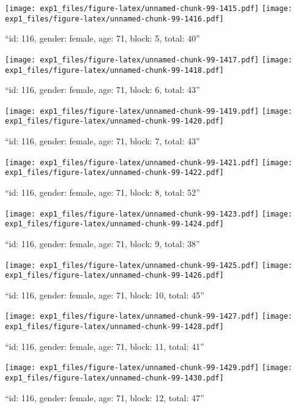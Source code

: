 \documentclass[,]{article}
\begin{document}
\texttt{[image: exp1\_files/figure-latex/unnamed-chunk-99-1415.pdf]}
\texttt{[image: exp1\_files/figure-latex/unnamed-chunk-99-1416.pdf]}

\newpage
[1] 

``id: 116, gender: female, age: 71, block: 5, total: 40''

\texttt{[image: exp1\_files/figure-latex/unnamed-chunk-99-1417.pdf]}
\texttt{[image: exp1\_files/figure-latex/unnamed-chunk-99-1418.pdf]}

\newpage
[1] 

``id: 116, gender: female, age: 71, block: 6, total: 43''

\texttt{[image: exp1\_files/figure-latex/unnamed-chunk-99-1419.pdf]}
\texttt{[image: exp1\_files/figure-latex/unnamed-chunk-99-1420.pdf]}

\newpage
[1] 

``id: 116, gender: female, age: 71, block: 7, total: 43''

\texttt{[image: exp1\_files/figure-latex/unnamed-chunk-99-1421.pdf]}
\texttt{[image: exp1\_files/figure-latex/unnamed-chunk-99-1422.pdf]}

\newpage
[1] 

``id: 116, gender: female, age: 71, block: 8, total: 52''

\texttt{[image: exp1\_files/figure-latex/unnamed-chunk-99-1423.pdf]}
\texttt{[image: exp1\_files/figure-latex/unnamed-chunk-99-1424.pdf]}

\newpage
[1] 

``id: 116, gender: female, age: 71, block: 9, total: 38''

\texttt{[image: exp1\_files/figure-latex/unnamed-chunk-99-1425.pdf]}
\texttt{[image: exp1\_files/figure-latex/unnamed-chunk-99-1426.pdf]}

\newpage
[1] 

``id: 116, gender: female, age: 71, block: 10, total: 45''

\texttt{[image: exp1\_files/figure-latex/unnamed-chunk-99-1427.pdf]}
\texttt{[image: exp1\_files/figure-latex/unnamed-chunk-99-1428.pdf]}

\newpage
[1] 

``id: 116, gender: female, age: 71, block: 11, total: 41''

\texttt{[image: exp1\_files/figure-latex/unnamed-chunk-99-1429.pdf]}
\texttt{[image: exp1\_files/figure-latex/unnamed-chunk-99-1430.pdf]}

\newpage
[1] 

``id: 116, gender: female, age: 71, block: 12, total: 47''
\end{document}
